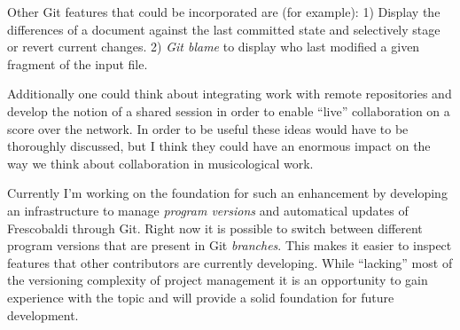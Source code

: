 \documentclass[oneside]{OLLbook}
\begin{document}
Other Git features that could be incorporated are (for example): 1) Display the differences of a document against the last committed state and selectively stage or revert current changes. 2) \emph{Git blame} to display who last modified a given fragment of the input file.

Additionally one could think about integrating work with remote repositories and develop the notion of a shared session in order to enable “live” collaboration on a score over the network.
In order to be useful these ideas would have to be thoroughly discussed, but I think they could have an enormous impact on the way we think about collaboration in musicological work.

Currently I'm working on the foundation for such an enhancement by developing an infrastructure to manage \emph{program versions} and automatical updates of Frescobaldi through Git.
Right now it is possible to switch between different program versions that are present in Git \emph{branches}.
This makes it easier to inspect features that other contributors are currently developing.
While “lacking” most of the versioning complexity of project management it is an opportunity to gain experience with the topic and will provide a solid foundation for future development.
\enlargethispage*{\baselineskip}
\end{document}
